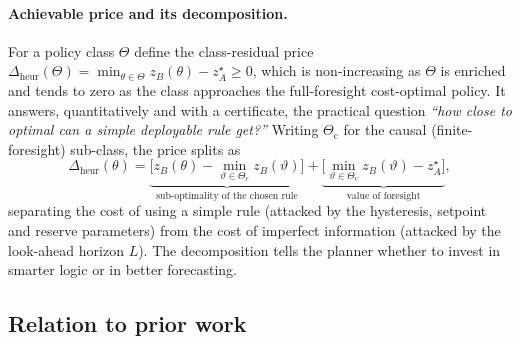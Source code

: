 \documentclass[11pt,a4paper]{article}
\theoremstyle{plain}
\theoremstyle{definition}
\begin{document}
\paragraph{Achievable price and its decomposition.} For a policy class $\Theta$ define the
class-residual price
$\Delta_{\mathrm{heur}}(\Theta)=\min_{\theta\in\Theta} z_B(\theta)-z_A^\star\ge0$, which is
non-increasing as $\Theta$ is enriched and tends to zero as the class approaches the
full-foresight cost-optimal policy. It answers, quantitatively and with a certificate, the
practical question \emph{``how close to optimal can a simple deployable rule get?''}
Writing $\Theta_{\mathrm{c}}$ for the causal (finite-foresight) sub-class, the price splits
as
\begin{equation}
  \Delta_{\mathrm{heur}}(\theta)
  = \underbrace{\big[z_B(\theta)-\min_{\vartheta\in\Theta_{\mathrm{c}}}z_B(\vartheta)\big]}
      _{\text{sub-optimality of the chosen rule}}
  + \underbrace{\big[\min_{\vartheta\in\Theta_{\mathrm{c}}}z_B(\vartheta)-z_A^\star\big]}
      _{\text{value of foresight}} ,
\end{equation}
separating the cost of using a simple rule (attacked by the hysteresis, setpoint and
reserve parameters) from the cost of imperfect information (attacked by the look-ahead
horizon $L$). The decomposition tells the planner whether to invest in smarter logic or in
better forecasting.

\subsection{Relation to prior work}
\end{document}
